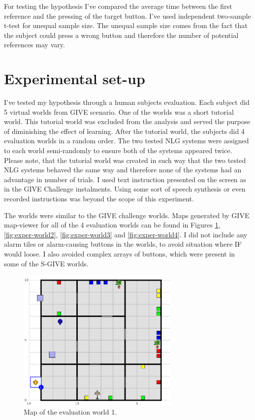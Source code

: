 For testing the hypothesis I've compared the average time between the first reference and the pressing of the target button. I've used independent two-sample t-test for unequal sample size. The unequal sample size comes from the fact that the subject could press a wrong button and therefore the number of potential references may vary. 

\section{Experimental set-up}
\label{sec:exper-setup}
I've tested my hypothesis through a human subjects evaluation. Each subject did 5 virtual worlds from GIVE scenario. One of the worlds was a short tutorial world. This tutorial world was excluded from the analysis and served the purpose of diminishing the effect of learning. After the tutorial world, the subjects did 4 evaluation worlds in a random order. The two tested NLG systems were assigned to each world semi-randomly to ensure both of the systems appeared twice. Please note, that the tutorial world was created in such way that the two tested NLG systems behaved the same way and therefore none of the systems had an advantage in number of trials. I used text instruction presented on the screen as in the GIVE Challenge instalments. Using some sort of speech synthesis or even recorded instructions was beyond the scope of this experiment.

The worlds were similar to the GIVE challenge worlds. Maps generated by GIVE map-viewer for all of the 4 evaluation worlds can be found in Figures \ref{fig:exper-world1}, \ref{fig:exper-world2}, \ref{fig:exper-world3} and \ref{fig:exper-world4}. I did not include any alarm tiles or alarm-causing buttons in the worlds, to avoid situation where IF would loose. I also avoided complex arrays of buttons, which were present in some of the S-GIVE worlds.

\begin{figure}[!htbp]
  \centering
	\includegraphics[width=0.7\textwidth]{Images/experiment-world-2}
	\caption{Map of the evaluation world 1.}
	\label{fig:exper-world1}
\end{figure}

